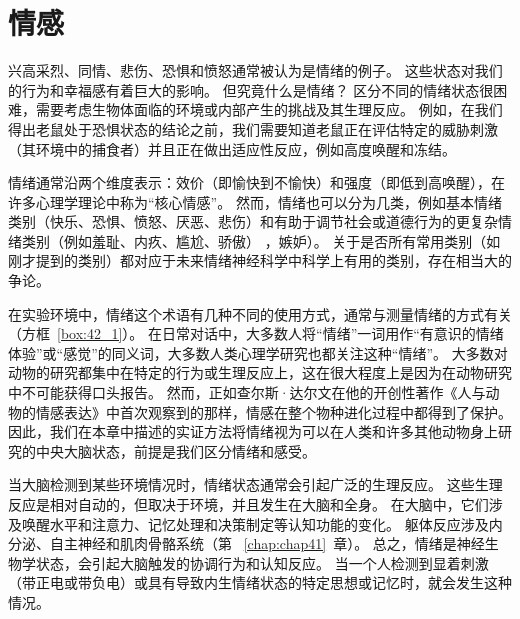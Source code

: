 \chapter{情感} \label{chap:chap42}

兴高采烈、同情、悲伤、恐惧和愤怒通常被认为是情绪的例子。
这些状态对我们的行为和幸福感有着巨大的影响。
但究竟什么是情绪？
区分不同的情绪状态很困难，需要考虑生物体面临的环境或内部产生的挑战及其生理反应。
例如，在我们得出老鼠处于恐惧状态的结论之前，我们需要知道老鼠正在评估特定的威胁刺激（其环境中的捕食者）并且正在做出适应性反应，例如高度唤醒和冻结。


情绪通常沿两个维度表示：效价（即愉快到不愉快）和强度（即低到高唤醒），在许多心理学理论中称为“核心情感”。
然而，情绪也可以分为几类，例如基本情绪类别（快乐、恐惧、愤怒、厌恶、悲伤）和有助于调节社会或道德行为的更复杂情绪类别（例如羞耻、内疚、尴尬、骄傲） ，嫉妒）。
关于是否所有常用类别（如刚才提到的类别）都对应于未来情绪神经科学中科学上有用的类别，存在相当大的争论。


在实验环境中，情绪这个术语有几种不同的使用方式，通常与测量情绪的方式有关（方框~\ref{box:42_1}）。
在日常对话中，大多数人将“情绪”一词用作“有意识的情绪体验”或“感觉”的同义词，大多数人类心理学研究也都关注这种“情绪”。
大多数对动物的研究都集中在特定的行为或生理反应上，这在很大程度上是因为在动物研究中不可能获得口头报告。
然而，正如查尔斯·达尔文在他的开创性著作《人与动物的情感表达》中首次观察到的那样，情感在整个物种进化过程中都得到了保护。 因此，我们在本章中描述的实证方法将情绪视为可以在人类和许多其他动物身上研究的中央大脑状态，前提是我们区分情绪和感受。

当大脑检测到某些环境情况时，情绪状态通常会引起广泛的生理反应。 这些生理反应是相对自动的，但取决于环境，并且发生在大脑和全身。 在大脑中，它们涉及唤醒水平和注意力、记忆处理和决策制定等认知功能的变化。 躯体反应涉及内分泌、自主神经和肌肉骨骼系统（第 ~\ref{chap:chap41}~章）。
总之，情绪是神经生物学状态，会引起大脑触发的协调行为和认知反应。
当一个人检测到显着刺激（带正电或带负电）或具有导致内生情绪状态的特定思想或记忆时，就会发生这种情况。


